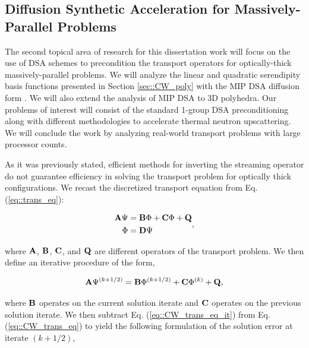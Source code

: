 \documentclass[11pt]{article}
\begin{document}
\subsection{Diffusion Synthetic Acceleration for Massively-Parallel Problems}
\label{sec::CW_DSA}

The second topical area of research for this dissertation work will focus on the use of DSA schemes to precondition the transport operators for optically-thick massively-parallel problems. We will analyze the linear and quadratic serendipity basis functions presented in Section \ref{sec::CW_poly} with the MIP DSA diffusion form \cite{ref::DSA_wang_ragusa,wang2009adaptive,turcksin2014discontinuous}. We will also extend the analysis of MIP DSA to 3D polyhedra. Our problems of interest will consist of the standard 1-group DSA preconditioning along with different methodologies to accelerate thermal neutron upscattering. We will conclude the work by analyzing real-world transport problems with large processor counts.

As it was previously stated, efficient methods for inverting the streaming operator do not guarantee efficiency in solving the transport problem for optically thick configurations. We recast the discretized transport equation from Eq. (\ref{eq::trans_eq}):

\begin{equation}
\label{eq::CW_trans_eq}
\begin{aligned}
{\bf A} \Psi &= {\bf B} \Phi +  {\bf C} \Phi + {\bf Q} \\
\Phi &= {\bf D} \Psi
\end{aligned} ,
\end{equation}

\noindent where ${\bf A}$, ${\bf B}$, ${\bf C}$, and ${\bf Q}$ are different operators of the transport problem. We then define an iterative procedure of the form,

\begin{equation}
\label{eq::CW_trans_eq_it}
{\bf A} \Psi^{(k+1/2)} = {\bf B} \Phi^{(k+1/2)} + {\bf C} \Phi^{(k)} + {\bf Q},
\end{equation}

\noindent where ${\bf B}$ operates on the current solution iterate and ${\bf C}$ operates on the previous solution iterate. We then subtract Eq. (\ref{eq::CW_trans_eq_it}) from Eq. (\ref{eq::CW_trans_eq}) to yield the following formulation of the solution error at iterate $(k+1/2)$,
\end{document}
